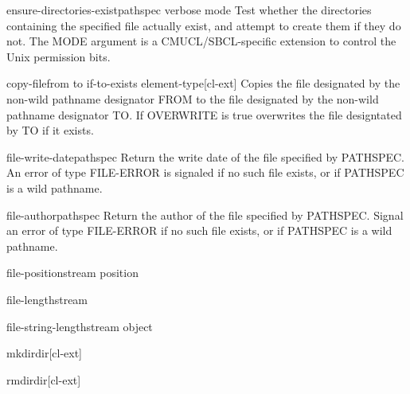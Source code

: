 \documentclass[10pt,english]{book}
\begin{document}
\begin{function}{ensure-directories-exist}{pathspec \key verbose mode}
  Test whether the directories containing the specified file
  actually exist, and attempt to create them if they do not.
  The MODE argument is a CMUCL/SBCL-specific extension to control
  the Unix permission bits.
\end{function}

\begin{function}{copy-file}{from to \key if-to-exists element-type}[cl-ext]
  Copies the file designated by the non-wild pathname designator FROM
  to the file designated by the non-wild pathname designator TO. If
  OVERWRITE is true overwrites the file designtated by TO if it
  exists.
\end{function}

\begin{function}{file-write-date}{pathspec}
  Return the write date of the file specified by PATHSPEC.
An error of type FILE-ERROR is signaled if no such file exists,
or if PATHSPEC is a wild pathname.
\end{function}

\begin{function}{file-author}{pathspec}
  Return the author of the file specified by PATHSPEC. Signal an
error of type FILE-ERROR if no such file exists, or if PATHSPEC
is a wild pathname.
\end{function}

\begin{function}{file-position}{stream \op position}
  
\end{function}

\begin{function}{file-length}{stream}
  
\end{function}

\begin{function}{file-string-length}{stream object}
  
\end{function}

\begin{function}{mkdir}{dir}[cl-ext]
  
\end{function}

\begin{function}{rmdir}{dir}[cl-ext]
  
\end{function}
\end{document}
